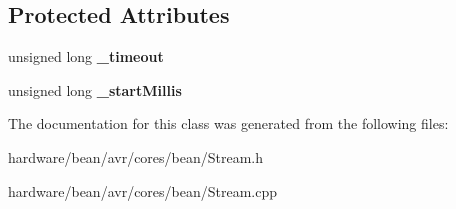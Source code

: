\subsection*{Protected Attributes}
\begin{DoxyCompactItemize}
\item 
\hypertarget{class_stream_aae48f1a926d2e82a452f2c75af0c6a29}{}unsigned long {\bfseries \+\_\+timeout}\label{class_stream_aae48f1a926d2e82a452f2c75af0c6a29}

\item 
\hypertarget{class_stream_abf61d2006d28d18f2e028285a323fe5a}{}unsigned long {\bfseries \+\_\+start\+Millis}\label{class_stream_abf61d2006d28d18f2e028285a323fe5a}

\end{DoxyCompactItemize}


The documentation for this class was generated from the following files\+:\begin{DoxyCompactItemize}
\item 
hardware/bean/avr/cores/bean/Stream.\+h\item 
hardware/bean/avr/cores/bean/Stream.\+cpp\end{DoxyCompactItemize}
